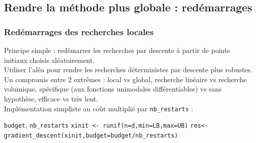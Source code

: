 \documentclass[12pt]{beamer}
\begin{document}
\subsection{Rendre la méthode plus globale : redémarrages}

\begin{frame}
\frametitle{Redémarrages des recherches locales} 
Principe simple : redémarrer les recherches par descente à partir de points initiaux choisis aléatoirement.\\
Utiliser l’aléa pour rendre les recherches déterministes par descente plus robustes.\\
Un compromis entre 2 extrêmes : local vs global, recherche linéaire vs recherche volumique, spécifique (aux fonctions unimodales différentiables) vs sans hypothèse, efficace vs très lent.\\
Implémentation simpliste 
au coût multiplié par \texttt{nb\_restarts} :
\vspace{-0.4cm}
\begin{center}
\begin{minipage}[t]{\textwidth}
\begin{algorithmic}
\REQUIRE \texttt{budget}, \texttt{nb\_restarts}
\STATE \texttt{xinit <- runif(n=d,min=LB,max=UB)}
\STATE \texttt{res<-gradient\_descent(xinit,budget=budget/nb\_restarts)}
\ENDFOR
\end{algorithmic}
\end{minipage}
\end{center}
\end{frame}
\end{document}
